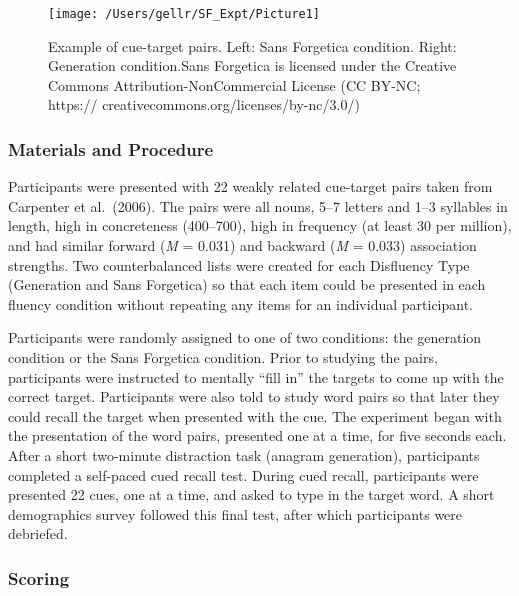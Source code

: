 \documentclass[
  english,
  jou]{apa6}
\begin{document}
\begin{figure}

{\centering \texttt{[image: /Users/gellr/SF\_Expt/Picture1]} 

}

\caption{Example of cue-target pairs. Left: Sans Forgetica condition. Right: Generation condition.Sans Forgetica is licensed under the Creative Commons Attribution-NonCommercial License (CC BY-NC; https:// creativecommons.org/licenses/by-nc/3.0/)}\label{fig:unnamed-chunk-1}
\end{figure}

\hypertarget{materials-and-procedure}{%
\subsubsection{Materials and Procedure}\label{materials-and-procedure}}

Participants were presented with 22 weakly related cue-target pairs taken from Carpenter et al.~(2006). The pairs were all nouns, 5--7 letters and 1--3 syllables in length, high in concreteness (400--700), high in frequency (at least 30 per million), and had similar forward (\emph{M} = 0.031) and backward (\emph{M} = 0.033) association strengths. Two counterbalanced lists were created for each Disfluency Type (Generation and Sans Forgetica) so that each item could be presented in each fluency condition without repeating any items for an individual participant.

Participants were randomly assigned to one of two conditions: the generation condition or the Sans Forgetica condition. Prior to studying the pairs, participants were instructed to mentally \enquote{fill in} the targets to come up with the correct target. Participants were also told to study word pairs so that later they could recall the target when presented with the cue. The experiment began with the presentation of the word pairs, presented one at a time, for five seconds each. After a short two-minute distraction task (anagram generation), participants completed a self-paced cued recall test. During cued recall, participants were presented 22 cues, one at a time, and asked to type in the target word. A short demographics survey followed this final test, after which participants were debriefed.

\hypertarget{scoring}{%
\subsubsection{Scoring}\label{scoring}}
\end{document}
